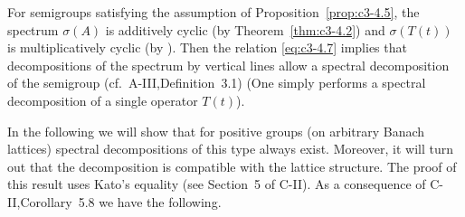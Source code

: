 %



For semigroups satisfying the assumption of Proposition~\ref{prop:c3-4.5}, the spectrum $\sigma(A)$ is additively cyclic (by Theorem~\ref{thm:c3-4.2}) and $\sigma(T(t))$ is multiplicatively cyclic
(by \citet[V.Theorem~4.4]{schaefer:1974}). 
Then the relation \eqref{eq:c3-4.7} implies that
decompositions of the spectrum by vertical lines allow a spectral
decomposition of the semigroup (cf.\ A-III,Definition~3.1) (One simply performs a spectral decomposition of a single operator $T(t)$). 

In the
following we will show that for positive groups (on arbitrary Banach
lattices) spectral decompositions of this type always exist. Moreover,
it will turn out that the decomposition is compatible with the lattice
structure. The proof of this result uses Kato's equality (see Section~5 of
C-II). As a consequence of C-II,Corollary~5.8 we have the following.

